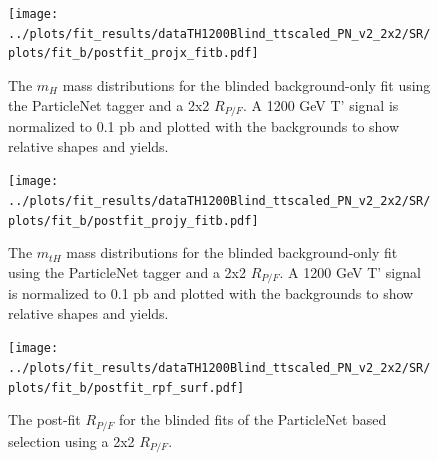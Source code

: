 \documentclass[10pt,oneside]{article}
\begin{document}
\begin{figure}[H]
    \centering
    \texttt{[image: ../plots/fit\_results/dataTH1200Blind\_ttscaled\_PN\_v2\_2x2/SR/plots/fit\_b/postfit\_projx\_fitb.pdf]}
    \caption{The $m_H$ mass distributions for the blinded background-only fit using the ParticleNet tagger and a 2x2 $R_{P/F}$.
    A 1200 GeV T' signal is normalized to 0.1 pb and plotted with the backgrounds to show relative shapes and yields.}
    \label{figs:PN_mh_2x2}
\end{figure}
\begin{figure}[H]
    \centering
    \texttt{[image: ../plots/fit\_results/dataTH1200Blind\_ttscaled\_PN\_v2\_2x2/SR/plots/fit\_b/postfit\_projy\_fitb.pdf]}
    \caption{The $m_{tH}$ mass distributions for the blinded background-only fit using the ParticleNet tagger and a 2x2 $R_{P/F}$.
    A 1200 GeV T' signal is normalized to 0.1 pb and plotted with the backgrounds to show relative shapes and yields.}
    \label{figs:PN_mth_2x2}
\end{figure}
\begin{figure}[H]
    \centering
    \texttt{[image: ../plots/fit\_results/dataTH1200Blind\_ttscaled\_PN\_v2\_2x2/SR/plots/fit\_b/postfit\_rpf\_surf.pdf]}
    \caption{The post-fit $R_{P/F}$ for the blinded fits of the ParticleNet based selection using a 2x2 $R_{P/F}$.}
    \label{figs:PN_rpf_2x2}
\end{figure}
\end{document}
